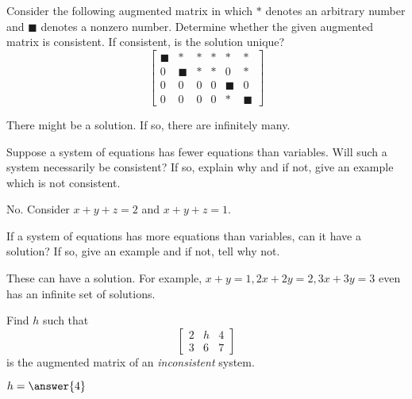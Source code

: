 \documentclass{ximera}
\begin{document}
\begin{problem}\label{prb:2.7}
Consider the following augmented matrix in which $\ast $ denotes an arbitrary
number and $\blacksquare $ denotes a nonzero number. Determine whether the
given augmented matrix is consistent. If consistent, is the solution unique?
\begin{equation*}
\left[
\begin{array}{ccccc|c}
\blacksquare & \ast & \ast & \ast & \ast & \ast \\
0 & \blacksquare & \ast & \ast & 0 & \ast \\
0 & 0 & 0 & 0 & \blacksquare & 0 \\
0 & 0 & 0 & 0 & \ast & \blacksquare
\end{array}
\right]
\end{equation*}
\begin{hint}
There might be a solution. If so, there are infinitely many.
\end{hint}
\end{problem}

\begin{problem}\label{prb:2.8}
Suppose a system of equations has fewer equations than variables. Will such a system necessarily be consistent? If so, explain why and if not, give an example
which is not consistent.
\begin{hint}
No. Consider $x+y+z=2$ and $x+y+z=1.$
\end{hint}
\end{problem}

\begin{problem}\label{prb:2.9}
If a system of equations has more equations than variables, can it
have a solution? If so, give an example and if not, tell why not.
\begin{hint}
These can
have a solution. For example, $x+y=1,2x+2y=2,3x+3y=3$ even has an infinite
set of solutions.
\end{hint}
\end{problem}

\begin{problem}\label{prb:2.10}
Find $h$ such that
\begin{equation*}
\left[
\begin{array}{rr|r}
2 & h & 4 \\
3 & 6 & 7
\end{array}
\right]
\end{equation*}
is the augmented matrix of an \textit{inconsistent} system.

$h=\answer{4}$

\end{problem}
\end{document}
